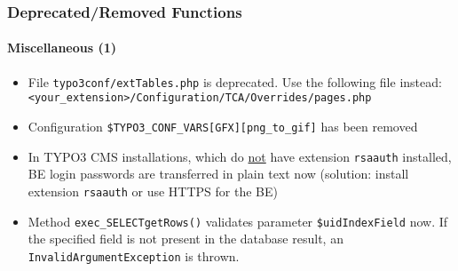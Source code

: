 \begin{frame}[fragile]
	\frametitle{Deprecated/Removed Functions}
	\framesubtitle{Miscellaneous (1)}

	\begin{itemize}

		\item File \texttt{typo3conf/extTables.php} is deprecated.\newline
			Use the following file instead:\newline
			\smaller\texttt{<your\_extension>/Configuration/TCA/Overrides/pages.php}\normalsize

		\item Configuration \texttt{\$TYPO3\_CONF\_VARS[GFX][png\_to\_gif]} has been removed

		\item In TYPO3 CMS installations, which do \underline{not} have extension
			\texttt{rsaauth} installed, BE login passwords are transferred in plain text now\newline
			\small(solution: install extension \texttt{rsaauth} or use HTTPS for the BE)\normalsize

		\item Method \texttt{exec\_SELECTgetRows()} validates parameter \texttt{\$uidIndexField} now.
			If the specified field is not present in the database result, an
			\texttt{InvalidArgumentException} is thrown.

	\end{itemize}

\end{frame}


